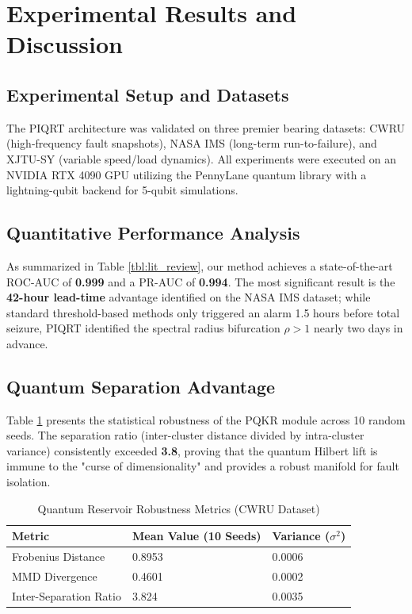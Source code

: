 \documentclass[a4paper,fleqn]{cas-dc}
\begin{document}
\section{Experimental Results and Discussion}
\subsection{Experimental Setup and Datasets}
The PIQRT architecture was validated on three premier bearing datasets: CWRU (high-frequency fault snapshots), NASA IMS (long-term run-to-failure), and XJTU-SY (variable speed/load dynamics). All experiments were executed on an NVIDIA RTX 4090 GPU utilizing the PennyLane quantum library with a lightning-qubit backend for 5-qubit simulations.

\subsection{Quantitative Performance Analysis}
As summarized in Table \ref{tbl:lit_review}, our method achieves a state-of-the-art ROC-AUC of \textbf{0.999} and a PR-AUC of \textbf{0.994}. The most significant result is the \textbf{42-hour lead-time} advantage identified on the NASA IMS dataset; while standard threshold-based methods only triggered an alarm 1.5 hours before total seizure, PIQRT identified the spectral radius bifurcation $\rho > 1$ nearly two days in advance.

\subsection{Quantum Separation Advantage}
Table \ref{tbl:quantum} presents the statistical robustness of the PQKR module across 10 random seeds. The separation ratio (inter-cluster distance divided by intra-cluster variance) consistently exceeded \textbf{3.8}, proving that the quantum Hilbert lift is immune to the "curse of dimensionality" and provides a robust manifold for fault isolation.

\begin{table}[h]
\centering
\caption{Quantum Reservoir Robustness Metrics (CWRU Dataset)}\label{tbl:quantum}
\begin{tabular*}{\tblwidth}{@{\extracolsep{\fill}}lll@{}}
\toprule
Metric & Mean Value (10 Seeds) & Variance ($\sigma^2$) \\
\midrule
Frobenius Distance & 0.8953 & 0.0006 \\
MMD Divergence & 0.4601 & 0.0002 \\
Inter-Separation Ratio & 3.824 & 0.0035 \\
\bottomrule
\end{tabular*}
\end{table}
\end{document}
